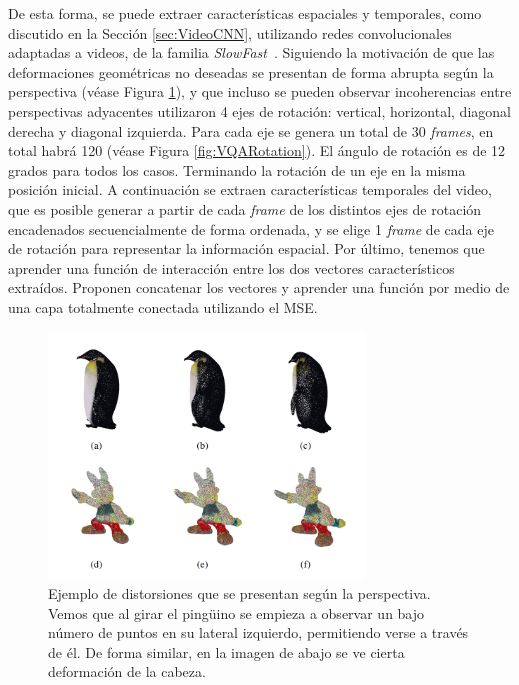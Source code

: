 De esta forma, se puede extraer características espaciales y temporales, como 
discutido en la Sección \ref{sec:VideoCNN}, utilizando redes convolucionales 
adaptadas a videos, de la familia \emph{SlowFast}~\cite{SlowFastNetworks}.
Siguiendo la motivación de que las deformaciones geométricas no deseadas se presentan 
de forma abrupta según la perspectiva (véase Figura \ref{fig:ViewPoint}), y que 
incluso se pueden observar incoherencias entre perspectivas adyacentes
utilizaron 4 ejes de rotación: vertical, horizontal, diagonal derecha 
y diagonal izquierda. Para cada eje se genera un total de 30 \emph{frames}, 
en total habrá 120 (véase Figura \ref{fig:VQARotation}). El ángulo de rotación es de 12 grados para todos los casos. 
Terminando la rotación de un eje en la misma posición inicial. 
A continuación se extraen características temporales del video, que es posible 
generar a partir de cada \emph{frame} de los distintos ejes de rotación encadenados
secuencialmente de forma ordenada, y se elige 1 \emph{frame} de cada 
eje de rotación para representar la información espacial. Por último, 
tenemos que aprender una función de interacción entre los dos vectores característicos 
extraídos. Proponen concatenar los vectores y aprender una función por 
medio de una capa totalmente conectada utilizando el MSE.

\begin{figure}
  \begin{center}
    \includegraphics[width=0.75\textwidth]{imagenes/chapter4/ViewPoint}
  \end{center}
  \caption[Ejemplo de distorsiones que se presentan según la perspectiva.]{
  Ejemplo de distorsiones que se presentan según la perspectiva.
Vemos que al girar el pingüino se empieza a observar un bajo número de puntos en su 
lateral izquierdo, permitiendo verse a través de él. De forma similar, 
en la imagen de abajo se ve cierta deformación de la cabeza.}
  \label{fig:ViewPoint}
\end{figure}

